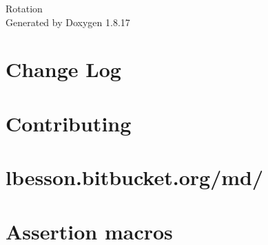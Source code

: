 \let\mypdfximage\pdfximage\def\pdfximage{\immediate\mypdfximage}\documentclass[twoside]{book}
\newcommand{\+}{\discretionary{\mbox{\scriptsize$\hookleftarrow$}}{}{}}
\newcommand{\clearemptydoublepage}{%
  \newpage{\pagestyle{empty}\cleardoublepage}%
}
\begin{document}
\hypersetup{pageanchor=false,
             bookmarksnumbered=true,
             pdfencoding=unicode
            }
\begin{titlepage}
\vspace*{7cm}
\begin{center}%
{\Large Rotation }\\
\vspace*{1cm}
{\large Generated by Doxygen 1.8.17}\\
\end{center}
\end{titlepage}
\clearemptydoublepage
{}
\tableofcontents
\clearemptydoublepage
{}
\hypersetup{pageanchor=true}

\chapter{Change Log}
\label{md__home_kalafiorek__programowanie_obj2021_zad4-_mateusz-_paszkiewicz_external_doctest__c_h_a_n_g_e_l_o_g}

\chapter{Contributing}
\label{md__home_kalafiorek__programowanie_obj2021_zad4-_mateusz-_paszkiewicz_external_doctest__c_o_n_t_r_i_b_u_t_i_n_g}

\chapter{lbesson.\+bitbucket.\+org/md/}
\label{md__home_kalafiorek__programowanie_obj2021_zad4-_mateusz-_paszkiewicz_external_doctest_doc_html_d607e59a7e8143745193394490eda33d}

\chapter{Assertion macros}
\label{md__home_kalafiorek__programowanie_obj2021_zad4-_mateusz-_paszkiewicz_external_doctest_doc_markdown_assertions}

\end{document}

